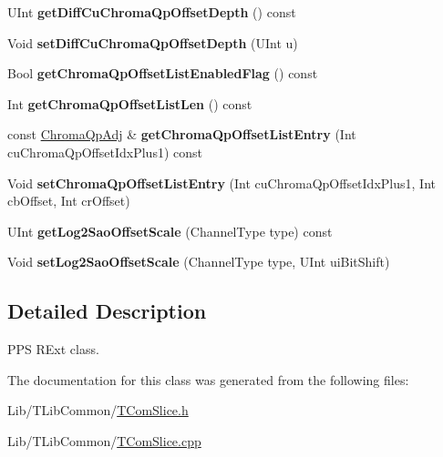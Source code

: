 \begin{DoxyCompactItemize}
U\+Int {\bfseries get\+Diff\+Cu\+Chroma\+Qp\+Offset\+Depth} () const
\item 
\mbox{\label{class_t_com_p_p_s_r_ext_ae4aebf02cb44020c0275c755b2208ae9}} 
Void {\bfseries set\+Diff\+Cu\+Chroma\+Qp\+Offset\+Depth} (U\+Int u)
\item 
\mbox{\label{class_t_com_p_p_s_r_ext_a30ec8cd317bc7fae1200051b0aed513f}} 
Bool {\bfseries get\+Chroma\+Qp\+Offset\+List\+Enabled\+Flag} () const
\item 
\mbox{\label{class_t_com_p_p_s_r_ext_ace144b2d0c9de0082d8492c1bfbcdd08}} 
Int {\bfseries get\+Chroma\+Qp\+Offset\+List\+Len} () const
\item 
\mbox{\label{class_t_com_p_p_s_r_ext_af123bd35162dd81f824601cdd16d5747}} 
const \hyperlink{struct_chroma_qp_adj}{Chroma\+Qp\+Adj} \& {\bfseries get\+Chroma\+Qp\+Offset\+List\+Entry} (Int cu\+Chroma\+Qp\+Offset\+Idx\+Plus1) const
\item 
\mbox{\label{class_t_com_p_p_s_r_ext_acc3e91bac2ec52f3214ea5356b5848f7}} 
Void {\bfseries set\+Chroma\+Qp\+Offset\+List\+Entry} (Int cu\+Chroma\+Qp\+Offset\+Idx\+Plus1, Int cb\+Offset, Int cr\+Offset)
\item 
\mbox{\label{class_t_com_p_p_s_r_ext_a4a5c5eea1ae135a3cc2ce49245161dff}} 
U\+Int {\bfseries get\+Log2\+Sao\+Offset\+Scale} (Channel\+Type type) const
\item 
\mbox{\label{class_t_com_p_p_s_r_ext_ac132a3f9069adb1ead5f1ce372401f10}} 
Void {\bfseries set\+Log2\+Sao\+Offset\+Scale} (Channel\+Type type, U\+Int ui\+Bit\+Shift)
\end{DoxyCompactItemize}
{\bf }\par



\subsection{Detailed Description}
P\+PS R\+Ext class. 

The documentation for this class was generated from the following files\+:\begin{DoxyCompactItemize}
\item 
Lib/\+T\+Lib\+Common/\hyperlink{_t_com_slice_8h}{T\+Com\+Slice.\+h}\item 
Lib/\+T\+Lib\+Common/\hyperlink{_t_com_slice_8cpp}{T\+Com\+Slice.\+cpp}\end{DoxyCompactItemize}
